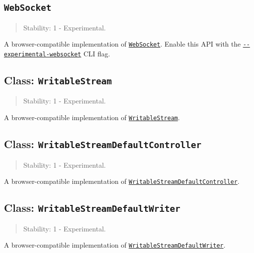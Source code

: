 \subsection{\texorpdfstring{\texttt{WebSocket}}{WebSocket}}\label{websocket}

\begin{quote}
Stability: 1 - Experimental.
\end{quote}

A browser-compatible implementation of
\href{https://developer.mozilla.org/en-US/docs/Web/API/WebSocket}{\texttt{WebSocket}}.
Enable this API with the
\href{cli.md\#--experimental-websocket}{\texttt{-\/-experimental-websocket}}
CLI flag.

\subsection{\texorpdfstring{Class:
\texttt{WritableStream}}{Class: WritableStream}}\label{class-writablestream}

\begin{quote}
Stability: 1 - Experimental.
\end{quote}

A browser-compatible implementation of
\href{webstreams.md\#class-writablestream}{\texttt{WritableStream}}.

\subsection{\texorpdfstring{Class:
\texttt{WritableStreamDefaultController}}{Class: WritableStreamDefaultController}}\label{class-writablestreamdefaultcontroller}

\begin{quote}
Stability: 1 - Experimental.
\end{quote}

A browser-compatible implementation of
\href{webstreams.md\#class-writablestreamdefaultcontroller}{\texttt{WritableStreamDefaultController}}.

\subsection{\texorpdfstring{Class:
\texttt{WritableStreamDefaultWriter}}{Class: WritableStreamDefaultWriter}}\label{class-writablestreamdefaultwriter}

\begin{quote}
Stability: 1 - Experimental.
\end{quote}

A browser-compatible implementation of
\href{webstreams.md\#class-writablestreamdefaultwriter}{\texttt{WritableStreamDefaultWriter}}.
